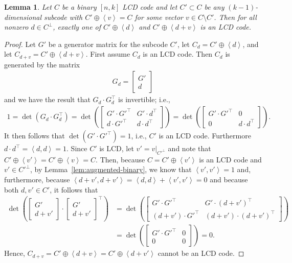 \documentclass[10pt,a4paper]{amsart}
\newtheorem{lemma}{Lemma}
\newcommand{\Ang}[1]{\left\langle#1\right\rangle}
\begin{document}
\begin{lemma}\label{lem:half-neighbors}
	Let $C$ be a binary $[n, k]$ LCD code and let $C' \subset C$ be any $(k - 1)$-dimensional subcode with $C' \oplus \Ang{v} = C$ for some vector $v \in C \setminus C'$.
	Then for all nonzero $d \in C^\perp$, exactly one of $C' \oplus \Ang{d}$ and $C' \oplus \Ang{d + v}$ is an LCD code.
\end{lemma}

\begin{proof}
	Let $G'$ be a generator matrix for the subcode $C'$, let $C_d = C' \oplus \Ang{d}$, and let $C_{d + v} = C' \oplus \Ang{d + v}$.
	First  assume $C_d$ is an LCD code.
	Then $C_d$ is generated by the matrix
	\begin{align*}
		G_d = \begin{bmatrix}
			G' \\
			d
		\end{bmatrix}
	\end{align*}
	and we have the result that $G_d \cdot G_d^\top$ is invertible; i.e.,
	\begin{align*}
		1
		= \det(G_d \cdot G_d^\top)
		= \det \left( \begin{bmatrix}
			G' \cdot G'^\top & G' \cdot d^\top \\
			d \cdot G'^\top & d \cdot d^\top
		\end{bmatrix} \right)
		= \det \left( \begin{bmatrix}
			G' \cdot G'^\top & 0 \\
			0 & d \cdot d^\top
		\end{bmatrix} \right).
	\end{align*}
	It then follows that $\det(G' \cdot G'^\top) = 1$, i.e., $C'$ is an LCD code.
	Furthermore $d \cdot d^\top = \Ang{d, d} = 1$.
	Since $C'$ is LCD, let $v' = v |_{C'^\perp}$ and note that $C' \oplus \Ang{v'} = C' \oplus \Ang{v} = C$.
	Then, because $C = C' \oplus \Ang{v'}$ is an LCD code and $v' \in C'^\perp$, by Lemma~\ref{lem:augmented-binary}, we know that $\Ang{v', v'} = 1$ and, furthermore, because $\Ang{d + v', d + v'} = \Ang{d, d} + \Ang{v', v'} = 0$ and because both $d, v' \in C'$, it follows that
	\begin{align*}
		\det \left( \begin{bmatrix}
			G' \\
			d + v'
		\end{bmatrix} \cdot {\begin{bmatrix}
			G' \\
			d + v'
		\end{bmatrix}}^\top \right)
		&= \det \left( \begin{bmatrix}
			G' \cdot G'^\top & G' \cdot {(d + v')}^\top \\
			(d + v') \cdot G'^\top & (d + v') \cdot {(d + v')}^\top
		\end{bmatrix} \right) \\
		&= \det \left( \begin{bmatrix}
			G' \cdot G'^\top & 0 \\
			0 & 0
		\end{bmatrix} \right)
		= 0.
	\end{align*}
	Hence, $C_{d + v} = C' \oplus \Ang{d + v} = C' \oplus \Ang{d + v'}$ cannot be an LCD code.


\end{proof}
\end{document}
